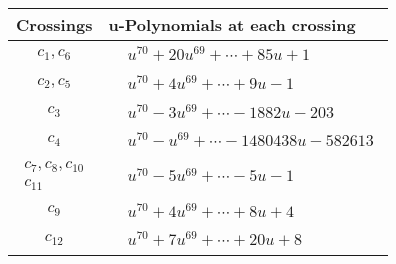 \documentclass[1p]{elsarticle_modified}
\theoremstyle{definition}
\begin{document}
\begin{tabular}{m{50pt}|m{274pt}}
Crossings & \hspace{64pt}u-Polynomials at each crossing \\
\hline $$\begin{aligned}c_{1},c_{6}\end{aligned}$$&$\begin{aligned}
&u^{70}+20 u^{69}+\cdots+85 u+1
\end{aligned}$\\
\hline $$\begin{aligned}c_{2},c_{5}\end{aligned}$$&$\begin{aligned}
&u^{70}+4 u^{69}+\cdots+9 u-1
\end{aligned}$\\
\hline $$\begin{aligned}c_{3}\end{aligned}$$&$\begin{aligned}
&u^{70}-3 u^{69}+\cdots-1882 u-203
\end{aligned}$\\
\hline $$\begin{aligned}c_{4}\end{aligned}$$&$\begin{aligned}
&u^{70}- u^{69}+\cdots-1480438 u-582613
\end{aligned}$\\
\hline $$\begin{aligned}c_{7},c_{8},c_{10}\\c_{11}\end{aligned}$$&$\begin{aligned}
&u^{70}-5 u^{69}+\cdots-5 u-1
\end{aligned}$\\
\hline $$\begin{aligned}c_{9}\end{aligned}$$&$\begin{aligned}
&u^{70}+4 u^{69}+\cdots+8 u+4
\end{aligned}$\\
\hline $$\begin{aligned}c_{12}\end{aligned}$$&$\begin{aligned}
&u^{70}+7 u^{69}+\cdots+20 u+8
\end{aligned}$\\
\hline
\end{tabular}\\~\\
\end{document}
